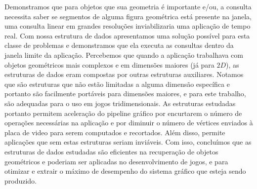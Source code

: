 Demonstramos que para objetos que sua geometria é importante e/ou, a consulta necessita saber se segmentos de alguma figura geométrica está presente na janela, uma consulta linear em grandes resoluções inviabilizaria uma aplicação de tempo real. Com nossa estrutura de dados apresentamos uma solução possível para esta classe de problemas e demonstramos que ela executa as consultas dentro da janela limite da aplicação. Percebemos que quando a aplicação trabalhava com objetos geométricos mais complexos e em dimensões maiores (já para $2D$), as estruturas de dados eram compostas por outras estruturas auxiliares. Notamos que são estruturas que não estão limitadas a alguma dimensão específica e portanto são facilmente portáveis para dimensões maiores, e para este trabalho, são adequadas para o uso em jogos tridimensionais. As estruturas estudadas portanto permitem aceleração do pipeline gráfico por encurtarem o número de operações necessárias na aplicação e por diminuir o número de vértices enviados à placa de video para serem computados e recortados. Além disso, permite aplicações que sem estas estruturas seriam inviáveis. Com isso, concluímos que as estruturas de dados estudadas são eficientes na recuperação de objetos geométricos e poderiam ser aplicadas no desenvolvimento de jogos, e para otimizar e extrair o máximo de desempenho do sistema gráfico que esteja sendo produzido.